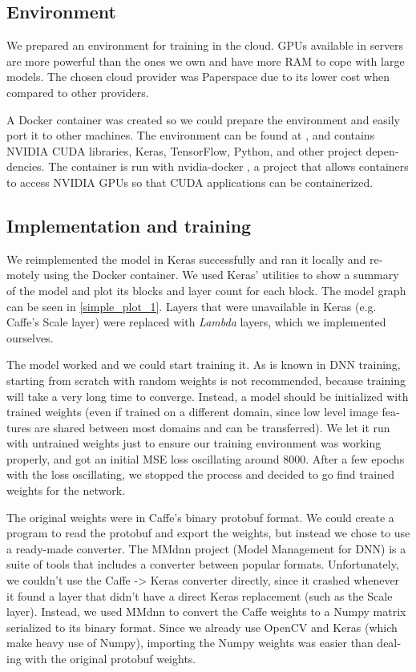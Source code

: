 \documentclass[12pt,openright,oneside,a4paper,english]{abntex2}
\begin{document}
\begin{otherlanguage}{english}
\subsection{Environment}

We prepared an environment for training in the cloud. GPUs available in servers are more powerful than the ones we own and have more RAM to cope with large models. The chosen cloud provider was Paperspace \cite{paperspace}
due to its lower cost when compared to other providers.

A Docker container was created so we could prepare the environment and easily port it to other machines. The environment can be found at \cite{colormotion_docker},
and contains NVIDIA CUDA libraries, Keras, TensorFlow, Python, and other project dependencies. The container is run with nvidia-docker \cite{nvidia_docker},
a project that allows containers to access NVIDIA GPUs so that CUDA applications can be containerized.

\subsection{Implementation and training}

We reimplemented the model in Keras successfully and ran it locally and remotely using the Docker container. We used Keras' utilities to show a summary of the model and plot its blocks and layer count for each block. The model graph can be seen in \ref{simple_plot_1}. Layers that were unavailable in Keras (e.g. Caffe's Scale layer) were replaced with \textit{Lambda} layers, which we implemented ourselves.

The model worked and we could start training it. As is known in DNN training, starting from scratch with random weights is not recommended, because training will take a very long time to converge. Instead, a model should be initialized with trained weights (even if trained on a different domain, since low level image features are shared between most domains and can be transferred). We let it run with untrained weights just to ensure our training environment was working properly, and got an initial MSE loss oscillating around 8000. After a few epochs with the loss oscillating, we stopped the process and decided to go find trained weights for the network.

The original weights were in Caffe's binary protobuf format. We could create a program to read the protobuf and export the weights, but instead we chose to use a ready-made converter. The MMdnn \cite{mmdnn} project (Model Management for DNN) is a suite of tools that includes a converter between popular formats. Unfortunately, we couldn't use the Caffe -> Keras converter directly, since it crashed whenever it found a layer that didn't have a direct Keras replacement (such as the Scale layer). Instead, we used MMdnn to convert the Caffe weights to a Numpy matrix serialized to its binary format. Since we already use OpenCV and Keras (which make heavy use of Numpy), importing the Numpy weights was easier than dealing with the original protobuf weights.


\end{otherlanguage}
\end{document}
